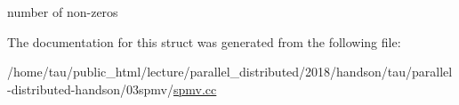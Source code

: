 number of non-\/zeros 

The documentation for this struct was generated from the following file\+:\begin{DoxyCompactItemize}
\item 
/home/tau/public\+\_\+html/lecture/parallel\+\_\+distributed/2018/handson/tau/parallel-\/distributed-\/handson/03spmv/\hyperlink{spmv_8cc}{spmv.\+cc}\end{DoxyCompactItemize}
